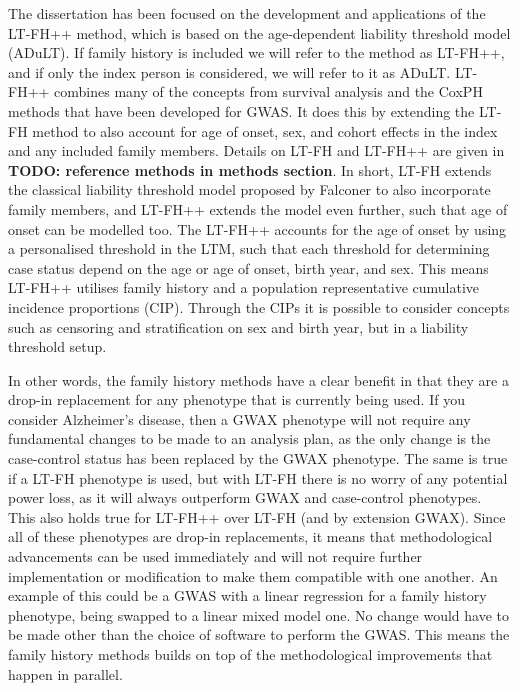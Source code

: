 The dissertation has been focused on the development and applications of the LT-FH++ method, which is based on the age-dependent liability threshold model (ADuLT). If family history is included we will refer to the method as LT-FH++, and if only the index person is considered, we will refer to it as ADuLT. LT-FH++ combines many of the concepts from survival analysis and the CoxPH methods that have been developed for GWAS. It does this by extending the LT-FH method to also account for age of onset, sex, and cohort effects in the index and any included family members. Details on LT-FH and LT-FH++ are given in \textbf{TODO: reference methods in methods section}. In short, LT-FH extends the classical liability threshold model proposed by Falconer to also incorporate family members, and LT-FH++ extends the model even further, such that age of onset can be modelled too. The LT-FH++ accounts for the age of onset by using a personalised threshold in the LTM, such that each threshold for determining case status depend on the age or age of onset, birth year, and sex. This means LT-FH++ utilises family history and a population representative cumulative incidence proportions (CIP). Through the CIPs it is possible to consider concepts such as censoring and stratification on sex and birth year, but in a liability threshold setup.

In other words, the family history methods have a clear benefit in that they are a drop-in replacement for any phenotype that is currently being used. If you consider Alzheimer's disease, then a GWAX phenotype will not require any fundamental changes to be made to an analysis plan, as the only change is the case-control status has been replaced by the GWAX phenotype. The same is true if a LT-FH phenotype is used, but with LT-FH there is no worry of any potential power loss, as it will always outperform GWAX and case-control phenotypes. This also holds true for LT-FH++ over LT-FH (and by extension GWAX). Since all of these phenotypes are drop-in replacements, it means that methodological advancements can be used immediately and will not require further implementation or modification to make them compatible with one another. An example of this could be a GWAS with a linear regression for a family history phenotype, being swapped to a linear mixed model one. No change would have to be made other than the choice of software to perform the GWAS. This means the family history methods builds on top of the methodological improvements that happen in parallel.

